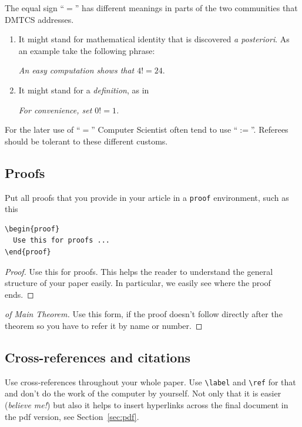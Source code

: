 \documentclass[
submission
]{dmtcs-episciences}
\begin{document}
  
The equal sign ``$=$'' has different meanings in parts of the two
communities that DMTCS addresses.
\begin{enumerate}
\item It might stand for mathematical identity that is discovered
  \emph{a posteriori}. As an example take the following phrase:
  \begin{center}
    \emph{An easy computation shows that $4!=24$}.
  \end{center}
\item It might stand for a \emph{definition}, as in
  \begin{center}
    \emph{For convenience, set $0!=1$.}
  \end{center}
\end{enumerate}
For the later use of ``$=$'' Computer Scientist often tend to use
``$:=$''. Referees should be tolerant to these different customs.


\subsection{Proofs}
\label{sec:proofs}

Put all proofs that you provide in your article in a \texttt{proof}
environment, such as this
\begin{verbatim}
\begin{proof}
  Use this for proofs ...
\end{proof}
\end{verbatim}

\begin{proof}
  Use this for proofs. This helps the reader to understand
  the general structure of your paper easily. In particular, we easily
  see where the proof ends.
\end{proof}

\begin{proof}[of Main Theorem]
  Use this form, if the proof doesn't follow directly after the
  theorem so you have to refer it by name or number.
\end{proof}


\subsection{Cross-references and citations}
\label{sec:cross}
Use cross-references throughout your whole paper. Use \verb!\label! and
\verb!\ref! for that and don't do the work of the computer by
yourself. Not only that it is easier (\emph{believe me!}) but also
it helps to insert hyperlinks across the final document in the pdf
version, see Section~\ref{sec:pdf}. 
\end{document}
